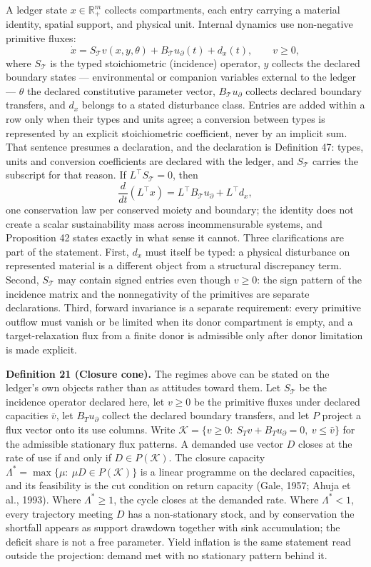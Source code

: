 \documentclass[11pt]{article}
\begin{document}
A ledger state \(x \in \mathbb{R}^m_+\) collects compartments, each
entry carrying a material identity, spatial support, and physical unit.
Internal dynamics use non-negative primitive fluxes:
\[\dot x = S_{\mathcal{T}} v(x, y, \theta) + B_{\mathcal{T}} u_{\partial}(t) + d_x(t), \qquad v \ge 0, \tag{1}\]
where \(S_{\mathcal{T}}\) is the typed stoichiometric (incidence)
operator, \(y\) collects the declared boundary states --- environmental
or companion variables external to the ledger --- \(\theta\) the
declared constitutive parameter vector, \(B_{\mathcal{T}} u_{\partial}\)
collects declared boundary transfers, and \(d_x\) belongs to a stated
disturbance class. Entries are added within a row only when their types and units agree; a conversion between types is
represented by an explicit stoichiometric coefficient, never by an implicit sum. That sentence presumes a
declaration, and the declaration is Definition 47: types, units and conversion coefficients are declared with
the ledger, and \(S_{\mathcal{T}}\) carries the subscript for that reason. If
\(L^\top S_{\mathcal{T}} = 0\), then
\[\frac{d}{dt}(L^\top x) = L^\top B_{\mathcal{T}} u_{\partial} + L^\top d_x,\]
one conservation law per conserved moiety and boundary; the identity does not create a scalar
sustainability mass across incommensurable systems, and Proposition 42 states exactly in what sense it cannot. Three clarifications are part of the statement. First, \(d_x\)
must itself be typed: a physical disturbance on represented material is
a different object from a structural discrepancy term. Second,
\(S_{\mathcal{T}}\) may contain signed entries even though \(v \ge 0\):
the sign pattern of the incidence matrix and the nonnegativity of the
primitives are separate declarations. Third, forward invariance is a
separate requirement: every primitive outflow must vanish or be limited
when its donor compartment is empty, and a target-relaxation flux from a
finite donor is admissible only after donor limitation is made explicit.

\textbf{Definition 21 (Closure cone).} The regimes above can be stated on the ledger's own objects rather
than as attitudes toward them. Let \(S_{\mathcal{T}}\) be the incidence operator declared here, let \(v\ge0\)
be the primitive fluxes under declared capacities \(\bar v\), let \(B_Tu_\partial\) collect the
declared boundary transfers, and let \(P\) project a flux vector onto its use columns. Write
\(\mathcal K=\{v\ge0:\ S_Tv+B_Tu_\partial=0,\ v\le\bar v\}\) for the admissible stationary flux
patterns. A demanded use vector \(D\) closes at the rate of use if and only if
\(D\in P(\mathcal K)\). The closure capacity
\(\Lambda^{*}=\max\{\mu:\ \mu D\in P(\mathcal K)\}\) is a linear programme on the declared
capacities, and its feasibility is the cut condition on return capacity (Gale, 1957; Ahuja et al.,
1993). Where \(\Lambda^{*}\ge1\), the cycle closes at the demanded rate. Where \(\Lambda^{*}<1\),
every trajectory meeting \(D\) has a non-stationary stock, and by conservation the shortfall appears
as support drawdown together with sink accumulation; the deficit share is not a free parameter. Yield
inflation is the same statement read outside the projection: demand met with no stationary pattern
behind it.
\end{document}
